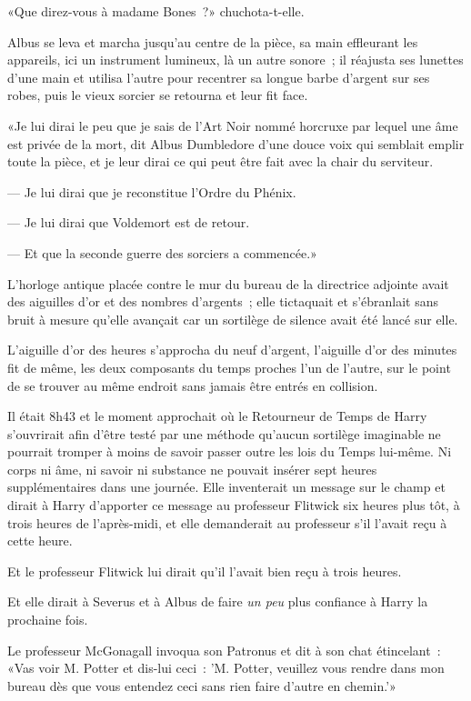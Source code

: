 «Que direz-vous à madame Bones~?» chuchota-t-elle.

Albus se leva et marcha jusqu'au centre de la pièce, sa main effleurant les appareils, ici un instrument lumineux, là un autre sonore~; il réajusta ses lunettes d'une main et utilisa l'autre pour recentrer sa longue barbe d'argent sur ses robes, puis le vieux sorcier se retourna et leur fit face.

«Je lui dirai le peu que je sais de l'Art Noir nommé horcruxe par lequel une âme est privée de la mort, dit Albus Dumbledore d'une douce voix qui semblait emplir toute la pièce, et je leur dirai ce qui peut être fait avec la chair du serviteur.

--- Je lui dirai que je reconstitue l'Ordre du Phénix.

--- Je lui dirai que Voldemort est de retour.

--- Et que la seconde guerre des sorciers a commencée.»


L'horloge antique placée contre le mur du bureau de la directrice adjointe avait des aiguilles d'or et des nombres d'argents~; elle tictaquait et s'ébranlait sans bruit à mesure qu'elle avançait car un sortilège de silence avait été lancé sur elle.

L'aiguille d'or des heures s'approcha du neuf d'argent, l'aiguille d'or des minutes fit de même, les deux composants du temps proches l'un de l'autre, sur le point de se trouver au même endroit sans jamais être entrés en collision.

Il était 8h43 et le moment approchait où le Retourneur de Temps de Harry s'ouvrirait afin d'être testé par une méthode qu'aucun sortilège imaginable ne pourrait tromper à moins de savoir passer outre les lois du Temps lui-même. Ni corps ni âme, ni savoir ni substance ne pouvait insérer sept heures supplémentaires dans une journée. Elle inventerait un message sur le champ et dirait à Harry d'apporter ce message au professeur Flitwick six heures plus tôt, à trois heures de l'après-midi, et elle demanderait au professeur s'il l'avait reçu à cette heure.

Et le professeur Flitwick lui dirait qu'il l'avait bien reçu à trois heures.

Et elle dirait à Severus et à Albus de faire \emph{un peu} plus confiance à Harry la prochaine fois.

Le professeur McGonagall invoqua son Patronus et dit à son chat étincelant~: «Vas voir M. Potter et dis-lui ceci~: 'M. Potter, veuillez vous rendre dans mon bureau dès que vous entendez ceci sans rien faire d'autre en chemin.'» 

